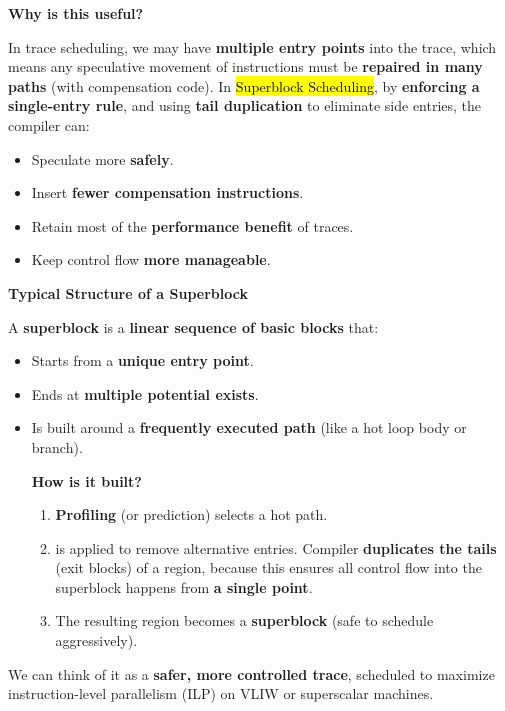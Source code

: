 \highspace
\begin{flushleft}
    \textcolor{Green3}{ \textbf{Why is this useful?}}
\end{flushleft}
In trace scheduling, we may have \textbf{multiple entry points} into the trace, which means any speculative movement of instructions must be \textbf{repaired in many paths} (with compensation code). In \hl{Superblock Scheduling}, by \textbf{enforcing a single-entry rule}, and using \textbf{tail duplication} to eliminate side entries, the compiler can:
\begin{itemize}[label=\textcolor{Green3}{}]
    \item Speculate more \textbf{safely}.
    \item Insert \textbf{fewer compensation instructions}.
    \item Retain most of the \textbf{performance benefit} of traces.
    \item Keep control flow \textbf{more manageable}.
\end{itemize}

\newpage

\begin{flushleft}
    \textcolor{Green3}{ \textbf{Typical Structure of a Superblock}}
\end{flushleft}
A \textbf{superblock} is a \textbf{linear sequence of basic blocks} that:
\begin{itemize}
    \item Starts from a \textbf{unique entry point}.
    \item Ends at \textbf{multiple potential exists}.
    \item Is built around a \textbf{frequently executed path} (like a hot loop body or branch).
    \begin{flushleft}
        \textcolor{Green3}{ \textbf{How is it built?}}
    \end{flushleft}
    \begin{enumerate}
        \item \textbf{Profiling} (or prediction) selects a hot path.
        \item {} is applied to remove alternative entries. Compiler \textbf{duplicates the tails} (exit blocks) of a region, because this ensures all control flow into the superblock happens from \textbf{a single point}.
        \item The resulting region becomes a \textbf{superblock} (safe to schedule aggressively).
    \end{enumerate}
\end{itemize}
We can think of it as a \textbf{safer, more controlled trace}, scheduled to maximize instruction-level parallelism (ILP) on VLIW or superscalar machines.

